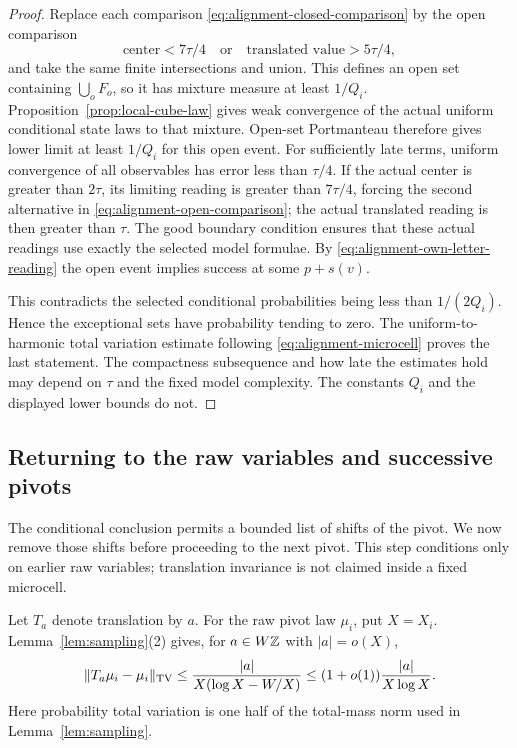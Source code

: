 \begin{proof}
Replace each comparison \eqref{eq:alignment-closed-comparison}
by the open comparison
\begin{equation}\label{eq:alignment-open-comparison}
 \text{center}<7\tau/4\quad\text{or}\quad
 \text{translated value}>5\tau/4,
\end{equation}
and take the same finite intersections and union.  This defines
an open set containing $\bigcup_oF_o$, so it has mixture measure
at least $1/Q_i$.  Proposition~\ref{prop:local-cube-law} gives
weak convergence of the actual uniform conditional state laws
to that mixture.  Open-set Portmanteau therefore gives lower
limit at least $1/Q_i$ for this open event.
For sufficiently late terms, uniform convergence of all
observables has error less than $\tau/4$.  If the actual center
is greater than $2\tau$, its limiting reading is greater than
$7\tau/4$, forcing the second alternative in
\eqref{eq:alignment-open-comparison}; the actual translated
reading is then greater than $\tau$.  The good boundary condition
ensures that these actual readings use exactly the selected
model formulae.  By \eqref{eq:alignment-own-letter-reading} the
open event implies success at some $p+s(v)$.

This contradicts the selected conditional probabilities being
less than $1/(2Q_i)$.  Hence the exceptional sets have probability
tending to zero.  The uniform-to-harmonic total variation estimate
following \eqref{eq:alignment-microcell} proves the last statement.
The compactness subsequence and how late the estimates hold may
depend on $\tau$ and the fixed model complexity.  The constants
$Q_i$ and the displayed lower bounds do not.
\end{proof}

\subsection{Returning to the raw variables and successive pivots}

The conditional conclusion permits a bounded list of shifts of
the pivot.  We now remove those shifts before proceeding to the
next pivot.  This step conditions only on earlier raw variables;
translation invariance is not claimed inside a fixed microcell.

Let $T_a$ denote translation by $a$.  For the raw pivot law $\mu_i$,
put $X=X_i$.  Lemma~\ref{lem:sampling}(2) gives, for $a\in W\mathbb Z$
with $|a|=o(X)$,
\begin{equation}\label{eq:alignment-raw-translation}
 \lVert T_a\mu_i-\mu_i\rVert_{\operatorname{TV}}
 \le\frac{|a|}{X(\log X-W/X)}
 \le (1+o(1))\frac{|a|}{X\log X}.
\end{equation}
Here probability total variation is one half of the total-mass norm
used in Lemma~\ref{lem:sampling}.

